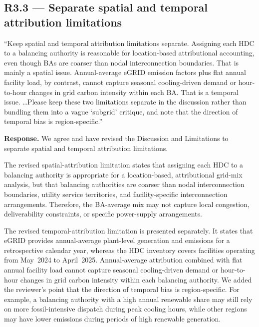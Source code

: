 \documentclass[11pt]{article}
\newenvironment{revquote}{%
  \begin{mdframed}[
    leftmargin=0.5em,
    rightmargin=0.5em,
    linewidth=0pt,
    backgroundcolor=gray!8,
    skipabove=0.5em,
    skipbelow=0.5em,
    innertopmargin=0.6em,
    innerbottommargin=0.6em,
    innerleftmargin=0.8em,
    innerrightmargin=0.8em
  ]%
  \itshape%
}{%
  \end{mdframed}%
}
\begin{document}
\subsection*{R3.3 --- Separate spatial and temporal attribution limitations}

\begin{revquote}
``Keep spatial and temporal attribution limitations separate. Assigning each HDC to a balancing authority is reasonable for location-based attributional accounting, even though BAs are coarser than nodal interconnection boundaries. That is mainly a spatial issue. Annual-average eGRID emission factors plus flat annual facility load, by contrast, cannot capture seasonal cooling-driven demand or hour-to-hour changes in grid carbon intensity within each BA. That is a temporal issue. \ldots Please keep these two limitations separate in the discussion rather than bundling them into a vague `subgrid' critique, and note that the direction of temporal bias is region-specific.''
\end{revquote}

\textbf{Response.} We agree and have revised the Discussion and Limitations to separate spatial and temporal attribution limitations.

The revised spatial-attribution limitation states that assigning each HDC to a balancing authority is appropriate for a location-based, attributional grid-mix analysis, but that balancing authorities are coarser than nodal interconnection boundaries, utility service territories, and facility-specific interconnection arrangements. Therefore, the BA-average mix may not capture local congestion, deliverability constraints, or specific power-supply arrangements.

The revised temporal-attribution limitation is presented separately. It states that eGRID provides annual-average plant-level generation and emissions for a retrospective calendar year, whereas the HDC inventory covers facilities operating from May~2024 to April~2025. Annual-average attribution combined with flat annual facility load cannot capture seasonal cooling-driven demand or hour-to-hour changes in grid carbon intensity within each balancing authority. We added the reviewer's point that the direction of temporal bias is region-specific. For example, a balancing authority with a high annual renewable share may still rely on more fossil-intensive dispatch during peak cooling hours, while other regions may have lower emissions during periods of high renewable generation.
\end{document}
